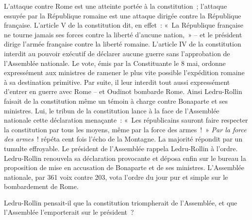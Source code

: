 \documentclass[twoside]{book} %
\begin{document}
L’attaque contre Rome est une atteinte portée à la constitution ; l’attaque essuyée par la République romaine est une attaque dirigée contre la République française. L’article V de la constitution dit, en effet : « La République française ne tourne jamais ses forces contre la liberté d’aucune nation, » – et le président dirige l’armée française contre la liberté romaine. L’article IV de la constitution interdit au pouvoir exécutif de déclarer aucune guerre sans l’approbation de l’Assemblée nationale. Le vote, émis par la Constituante le 8 mai, ordonne expressément aux ministres de ramener le plus vite possible l’expédition romaine à sa destination primitive. Par suite, il leur interdit tout aussi expressément d’entrer en guerre avec Rome – et Oudinot bombarde Rome. Ainsi Ledru-Rollin faisait de la constitution même un témoin à charge contre Bonaparte et ses ministres. Lui, le tribun de la constitution lance à la face de l’Assemblée nationale cette déclaration menaçante : « Les républicains sauront faire respecter la constitution par tous les moyens, même par la force des armes ! » \emph{Par la force des armes} ! répéta cent fois l’écho de la Montagne. La majorité répondit par un tumulte effroyable. Le président de l’Assemblée rappela Ledru-Rollin à l’ordre. Ledru-Rollin renouvela sa déclaration provocante et déposa enfin sur le bureau la proposition de mise en accusation de Bonaparte et de ses ministres. L’Assemblée nationale, par 361 voix contre 203, vota l’ordre du jour pur et simple sur le bombardement de Rome.\par
Ledru-Rollin pensait-il que la constitution triompherait de l’Assemblée, et que l’Assemblée l’emporterait sur le président ?\par
\end{document}
